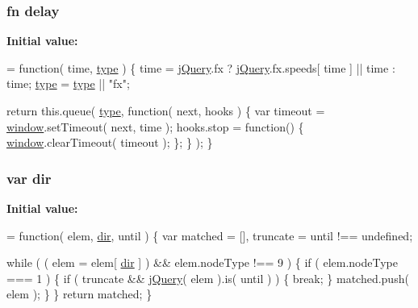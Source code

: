 \subsubsection[{\texorpdfstring{delay}{delay}}]{ {\bf fn} delay}\hypertarget{jquery-3_82_81_8js_afd564c048cc51264c198cfe26d88b7c6}{}\label{jquery-3_82_81_8js_afd564c048cc51264c198cfe26d88b7c6}
{\bfseries Initial value\+:}
\begin{DoxyCode}
= \textcolor{keyword}{function}( time, \hyperlink{jquery-3_82_81_8js_a4c4533b7d49de290bb8cccd4e6f43349}{type} ) \{
    time = \hyperlink{jquery-3_82_81_8js_a609525712f1102566c2b03866ceb2bba}{jQuery}.fx ? \hyperlink{jquery-3_82_81_8js_a609525712f1102566c2b03866ceb2bba}{jQuery}.fx.speeds[ time ] || time : time;
    \hyperlink{jquery-3_82_81_8js_a4c4533b7d49de290bb8cccd4e6f43349}{type} = \hyperlink{jquery-3_82_81_8js_a4c4533b7d49de290bb8cccd4e6f43349}{type} || \textcolor{stringliteral}{"fx"};

    \textcolor{keywordflow}{return} this.queue( \hyperlink{jquery-3_82_81_8js_a4c4533b7d49de290bb8cccd4e6f43349}{type}, \textcolor{keyword}{function}( next, hooks ) \{
        var timeout = \hyperlink{jquery-3_82_81_8js_ad55530ae1e5978df8e721017c1fc8466}{window}.setTimeout( next, time );
        hooks.stop = \textcolor{keyword}{function}() \{
            \hyperlink{jquery-3_82_81_8js_ad55530ae1e5978df8e721017c1fc8466}{window}.clearTimeout( timeout );
        \};
    \} );
\}
\end{DoxyCode}
\subsubsection[{\texorpdfstring{dir}{dir}}]{\setlength{\rightskip}{0pt plus 5cm}var dir}\hypertarget{jquery-3_82_81_8js_a2a297348e1717ffd9ad78297181e31b0}{}\label{jquery-3_82_81_8js_a2a297348e1717ffd9ad78297181e31b0}
{\bfseries Initial value\+:}
\begin{DoxyCode}
= \textcolor{keyword}{function}( elem, \hyperlink{jquery-3_82_81_8js_a2a297348e1717ffd9ad78297181e31b0}{dir}, until ) \{
    var matched = [],
        truncate = until !== undefined;

    \textcolor{keywordflow}{while} ( ( elem = elem[ \hyperlink{jquery-3_82_81_8js_a2a297348e1717ffd9ad78297181e31b0}{dir} ] ) && elem.nodeType !== 9 ) \{
        \textcolor{keywordflow}{if} ( elem.nodeType === 1 ) \{
            \textcolor{keywordflow}{if} ( truncate && \hyperlink{jquery-3_82_81_8js_a609525712f1102566c2b03866ceb2bba}{jQuery}( elem ).is( until ) ) \{
                \textcolor{keywordflow}{break};
            \}
            matched.push( elem );
        \}
    \}
    \textcolor{keywordflow}{return} matched;
\}
\end{DoxyCode}
